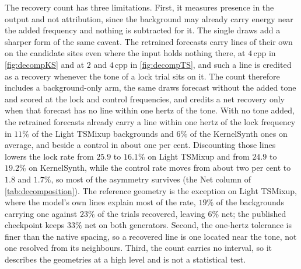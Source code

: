 The recovery count has three limitations. First, it measures presence in the output and not attribution, since the background may already carry energy near the added frequency and nothing is subtracted for it. The single draws add a sharper form of the same caveat. The retrained forecasts carry lines of their own on the candidate sites even where the input holds nothing there, at $4$\,cpp in \autoref{fig:decompKS} and at $2$ and $4$\,cpp in \autoref{fig:decompTS}, and such a line is credited as a recovery whenever the tone of a lock trial sits on it. The count therefore includes a background-only arm, the same draws forecast without the added tone and scored at the lock and control frequencies, and credits a net recovery only when that forecast has no line within one hertz of the tone. With no tone added, the retrained forecasts already carry a line within one hertz of the lock frequency in $11\%$ of the Light TSMixup backgrounds and $6\%$ of the KernelSynth ones on average, and beside a control in about one per cent. Discounting those lines lowers the lock rate from $25.9$ to $16.1\%$ on Light TSMixup and from $24.9$ to $19.2\%$ on KernelSynth, while the control rate moves from about two per cent to $1.8$ and $1.7\%$, so most of the asymmetry survives (the Net column of \autoref{tab:decomposition}). The reference geometry is the exception on Light TSMixup, where the model's own lines explain most of the rate, $19\%$ of the backgrounds carrying one against $23\%$ of the trials recovered, leaving $6\%$ net; the published checkpoint keeps $33\%$ net on both generators. Second, the one-hertz tolerance is finer than the native spacing, so a recovered line is one located near the tone, not one resolved from its neighbours. Third, the count carries no interval, so it describes the geometries at a high level and is not a statistical test.

